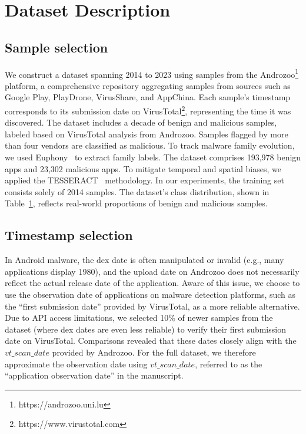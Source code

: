 \section{Dataset Description}
\label{dataset}

\subsection{Sample selection}
We construct a dataset spanning 2014 to 2023 using samples from the Androzoo\footnote{https://androzoo.uni.lu} platform, a comprehensive repository aggregating samples from sources such as Google Play, PlayDrone, VirusShare, and AppChina. Each sample's timestamp corresponds to its submission date on VirusTotal\footnote{https://www.virustotal.com}, representing the time it was discovered. The dataset includes a decade of benign and malicious samples, labeled based on VirusTotal analysis from Androzoo. Samples flagged by more than four vendors are classified as malicious. To track malware family evolution, we used Euphony~\cite{euphony} to extract family labels. The dataset comprises 193,978 benign apps and 23,302 malicious apps. To mitigate temporal and spatial biases, we applied the TESSERACT~\cite{tesseract} methodology. In our experiments, the training set consists solely of 2014 samples. The dataset's class distribution, shown in Table~\ref{dataset}, reflects real-world proportions of benign and malicious samples.

\subsection{Timestamp selection}
In Android malware, the dex date is often manipulated or invalid (e.g., many applications display 1980), and the upload date on Androzoo does not necessarily reflect the actual release date of the application. Aware of this issue, we choose to use the observation date of applications on malware detection platforms, such as the ``first submission date'' provided by VirusTotal, as a more reliable alternative. Due to API access limitations, we selected 10\% of newer samples from the dataset (where dex dates are even less reliable) to verify their first submission date on VirusTotal. Comparisons revealed that these dates closely align with the $vt\_scan\_date$ provided by Androzoo. For the full dataset, we therefore approximate the observation date using $vt\_scan\_date$, referred to as the ``application observation date'' in the manuscript. 

